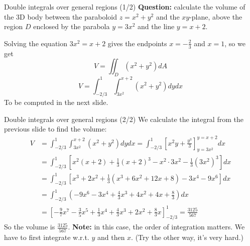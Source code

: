 \begin{frame}{Double integrals over general regions (1/2)}
         \textbf{Question:} calculate the volume of the 3D body between the paraboloid $z=x^2+y^2$ and the $xy$-plane, above the region $D$ enclosed by the parabola $y=3x^2$ and the line $y=x+2$.

            \begin{minipage}{0.4\textwidth}
            \end{minipage}\hspace{1.5cm}
            \begin{minipage}{0.45\textwidth}

                Solving the equation $3x^2=x+2$ gives the endpoints $x=-\frac{2}{3}$ and $x=1$, so we get \[V=\iint_{D}(x^2+y^2)dA\]\[\boxed{V=\int_{-2/3}^{1}\int_{3x^2}^{x+2}(x^2+y^2)dydx}\]
To be computed in the next slide.
            \end{minipage}

\end{frame}

\begin{frame}{Double integrals over general regions (2/2)}
\small
         We calculate the integral from the previous slide to find the volume:
         \begin{align*}
             V&=\int_{-2/3}^{1}\int_{3x^2}^{x+2}(x^2+y^2)dydx=\int_{-2/3}^{1}\left[x^2y+\frac{y^3}{3}\right]_{y=3x^2}^{y=x+2}dx\\
              &=\int_{-2/3}^{1}\left[x^2(x+2)+\frac{1}{3}(x+2)^3-x^2\cdot3x^2-\frac{1}{3}(3x^2)^3\right]dx\\
              &=\int_{-2/3}^{1}\left[x^3+2x^2+\frac{1}{3}\left(x^3+6x^2+12x+8\right)-3x^4-9x^6\right]dx\\
              &=\int_{-2/3}^{1}\left(-9x^6-3x^4+\frac{4}{3}x^3+4x^2+4x+\frac{8}{3}\right)dx\\
              &=\left[-\frac{9}{7}x^7-\frac{3}{5}x^5+\frac{1}{3}x^4+\frac{4}{3}x^3+2x^2+\frac{8}{3}x\right]_{-2/3}^{1} =\boxed{ \frac{3125}{567}}
         \end{align*}
         So the volume is $\frac{3125}{567}$. \textbf{Note:} in this case, the order of integration matters. We have to first integrate w.r.t. $y$ and then $x$. (Try the other way, it's very hard.)
\end{frame}

